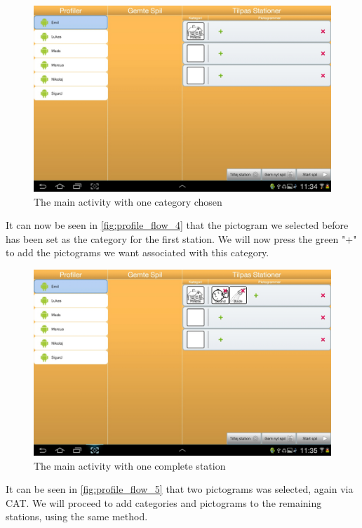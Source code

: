 \begin{figure}[H]
\centering
\includegraphics[width=1.0\linewidth]{img/screenshots/profile_flow_4.jpg}%
\caption{The main activity with one category chosen}
\label{fig:profile_flow_4}
\end{figure}

It can now be seen in \autoref{fig:profile_flow_4} that the pictogram we selected before has been set as the category for the first station. We will now press the green "+" to add the pictograms we want associated with this category.

\begin{figure}[H]
\centering
\includegraphics[width=1.0\linewidth]{img/screenshots/profile_flow_5.jpg}%
\caption{The main activity with one complete station}
\label{fig:profile_flow_5}
\end{figure}

It can be seen in \autoref{fig:profile_flow_5} that two pictograms was selected, again via CAT.  We will proceed to add categories and pictograms to the remaining stations, using the same method.

